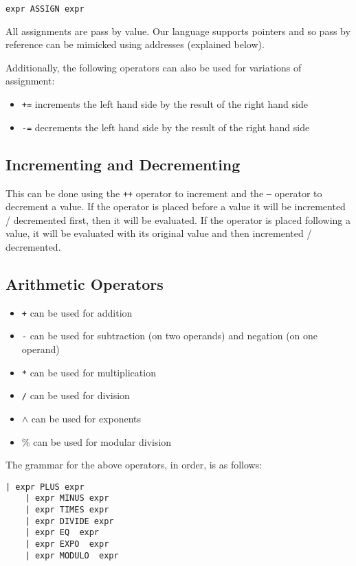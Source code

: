 \documentclass{article}
\begin{document}
\begin{Verbatim}[frame=single]
 expr ASSIGN expr 
\end{Verbatim}

All assignments are pass by value. Our language supports pointers and so pass by reference can be mimicked using addresses (explained below).

Additionally, the following operators can also be used for variations of assignment:

\begin{itemize}
\item \texttt{+=} increments the left hand side by the result of the right hand side
\item \texttt{-=} decrements the left hand side by the result of the right hand side
\end{itemize}

\subsection{Incrementing and Decrementing}
This can be done using the \texttt{++} operator to increment and the \texttt{--} operator to decrement a value.  If the operator is placed before a value it will be incremented / decremented first, then it will be evaluated.  If the operator is placed following a value, it will be evaluated with its original value and then incremented / decremented.

\subsection{Arithmetic Operators}
\begin{itemize}
\item \texttt{+} can be used for addition
\item \texttt{-} can be used for subtraction (on two operands) and negation (on one operand)
\item \texttt{*} can be used for multiplication
\item \texttt{/} can be used for division
\item \texttt{$\wedge$} can be used for exponents
\item \texttt{$\%$} can be used for modular division
\end{itemize}



The grammar for the above operators, in order, is as follows:
\begin{Verbatim}[frame=single]
	| expr PLUS expr 	
	| expr MINUS expr 	
	| expr TIMES expr 
	| expr DIVIDE expr 
	| expr EQ  expr 
	| expr EXPO  expr 
	| expr MODULO  expr 
\end{Verbatim}
\end{document}
